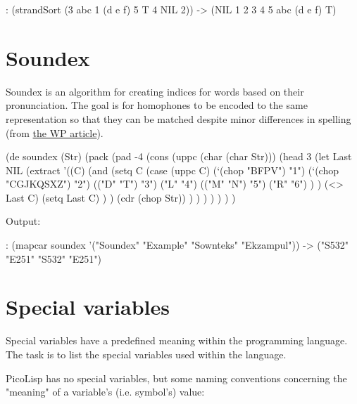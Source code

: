 \begin{itemize}
\begin{wideverbatim}
: (strandSort (3 abc 1 (d e f) 5 T 4 NIL 2))
-> (NIL 1 2 3 4 5 abc (d e f) T)

\end{wideverbatim}

\pagebreak{}
\section*{Soundex}

Soundex is an algorithm for creating indices for words based on their
pronunciation. The goal is for homophones to be encoded to the same
representation so that they can be matched despite minor differences in
spelling (from \href{http://en.wikipedia.org/wiki/soundex}{the WP
article}).


\begin{wideverbatim}

(de soundex (Str)
   (pack
      (pad -4
         (cons
            (uppc (char (char Str)))
            (head 3
               (let Last NIL
                  (extract
                     '((C)
                        (and
                           (setq C
                              (case (uppc C)
                                 (`(chop "BFPV") "1")
                                 (`(chop "CGJKQSXZ") "2")
                                 (("D" "T") "3")
                                 ("L" "4")
                                 (("M" "N") "5")
                                 ("R" "6") ) )
                           (<> Last C)
                           (setq Last C) ) )
                     (cdr (chop Str)) ) ) ) ) ) ) )

Output:

: (mapcar soundex '("Soundex" "Example" "Sownteks" "Ekzampul"))
-> ("S532" "E251" "S532" "E251")

\end{wideverbatim}

\pagebreak{}
\section*{Special variables}

Special variables have a predefined meaning within the programming
language. The task is to list the special variables used within the
language.


\begin{wideverbatim}

PicoLisp has no special variables, but some naming conventions concerning
the "meaning" of a variable's (i.e. symbol's) value:


\end{wideverbatim}
\end{itemize}

